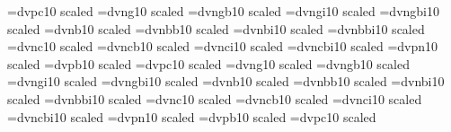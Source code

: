 \font\bigdnpcal=dvpc10 scaled
\font\largedn=dvng10 scaled
\font\largednb=dvngb10 scaled
\font\largedni=dvngi10 scaled
\font\largednbi=dvngbi10 scaled
\font\largednbom=dvnb10 scaled
\font\largednbomb=dvnbb10 scaled
\font\largednbomi=dvnbi10 scaled
\font\largednbombi=dvnbbi10 scaled
\font\largedncal=dvnc10 scaled
\font\largedncalb=dvncb10 scaled
\font\largedncali=dvnci10 scaled
\font\largedncalbi=dvncbi10 scaled
\font\largednp=dvpn10 scaled
\font\largednpbom=dvpb10 scaled
\font\largednpcal=dvpc10 scaled
\font\hugedn=dvng10 scaled
\font\hugednb=dvngb10 scaled
\font\hugedni=dvngi10 scaled
\font\hugednbi=dvngbi10 scaled
\font\hugednbom=dvnb10 scaled
\font\hugednbomb=dvnbb10 scaled
\font\hugednbomi=dvnbi10 scaled
\font\hugednbombi=dvnbbi10 scaled
\font\hugedncal=dvnc10 scaled
\font\hugedncalb=dvncb10 scaled
\font\hugedncali=dvnci10 scaled
\font\hugedncalbi=dvncbi10 scaled
\font\hugednp=dvpn10 scaled
\font\hugednpbom=dvpb10 scaled
\font\hugednpcal=dvpc10 scaled
%
%
